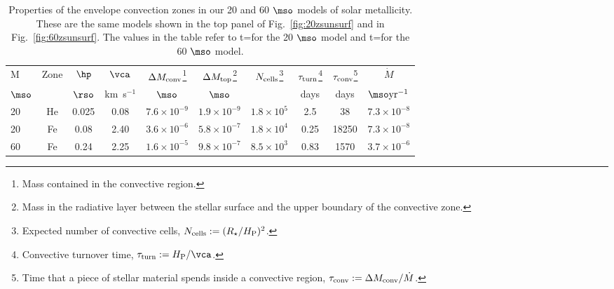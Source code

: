 \begin{table*} \label{tab:tab1}

\begin{minipage}{\textwidth}
\caption{Properties of the envelope convection zones in our 20 and 60 $\mso$ models of solar metallicity. These are the same models shown in the top panel of Fig.~\ref{fig:20zsunsurf} and in Fig.~\ref{fig:60zsunsurf}. The values in the table refer
to t=\ttwenty  for the 20 $\mso$ model and t=\tsixty for the 60 $\mso$ model.}
\label{clumps}
\renewcommand{\footnoterule}{}
\centering
\begin{tabular}{lccccccccc}
\hline\hline
   M        \T  & Zone    &      $\hp$ & $\vca$  & $\Delta M_{\rm conv}$\footnote{Mass contained in the convective region.}  & $\Delta M_{\rm top}$\footnote{Mass in the radiative layer between the stellar surface and the upper boundary of the convective zone.}  & $N_{\rm cells}$\footnote{Expected number of convective cells, $N_{\rm cells}:= (R_{\star}/H_{\rm P})^2$.}  & $\tau_{\rm turn}$\footnote{Convective turnover time, $\tau_{\rm turn}:= H_{\rm P}/\vca$.} &   $\tau_{\rm conv}$\footnote{Time that a piece of stellar material spends 
inside a convective region, $\tau_{\rm conv}:= \Delta M_{\rm conv}/\dot M$.} & $ \dot{M}$ \\
 $\mso$\T  &         & $\rso$ &  km~s$^{-1}$              & $\mso$             & $\mso$           &                  &       days          &  days     & $\mso \rm{ yr}^{-1}$ \\

\hline
20              & He      & 0.025      &   0.08       & $7.6\times10^{-9}$     &  $1.9\times10^{-9}$     & $1.8\times10^{5}$ &   2.5        &  38         &      $7.3\times10^{-8} $      \\
20              & Fe      & 0.08       &   2.40       & $3.6\times10^{-6}$     &  $5.8\times10^{-7}$     & $1.8\times10^{4}$  &   0.25       &  18250  &  $7.3\times10^{-8}$   \\
60              & Fe      & 0.24       &   2.25       & $1.6\times10^{-5}$     &  $9.8\times10^{-7}$     & $8.5\times10^{3}$  &   0.83       &   1570    &  $3.7\times10^{-6}$      \\
\hline

\end{tabular}
\end{minipage}

\end{table*}